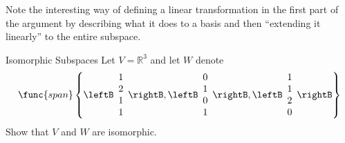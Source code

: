 Note the interesting way of defining a linear transformation in the first
part of the argument by describing what it does to a basis and then
``extending it linearly'' to the entire subspace.

\begin{example}{Isomorphic Subspaces}
Let $V=\mathbb{R}^{3}$ and let $W$ denote 
\begin{equation*}
\func{span}\left\{ \leftB 
\begin{array}{r}
1 \\ 
2 \\ 
1 \\ 
1
\end{array}
\rightB ,\leftB 
\begin{array}{r}
0 \\ 
1 \\ 
0 \\ 
1
\end{array}
\rightB ,\leftB 
\begin{array}{r}
1 \\ 
1 \\ 
2 \\ 
0
\end{array}
\rightB \right\}
\end{equation*}
Show that $V$ and $W$ are isomorphic. 
\end{example}

